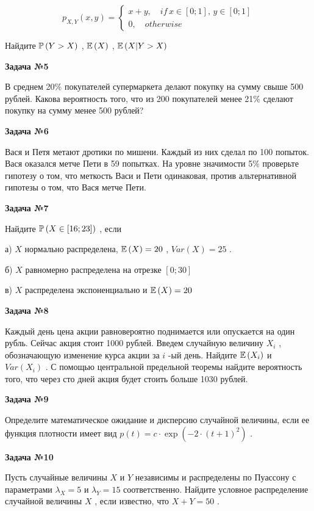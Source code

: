 \documentclass[pdftex,12pt,a4paper]{article}
\begin{document}
$$p_{X,Y} \left(x,y\right)=\left\{\begin{array}{l} {x+y,\quad if\, x\in \left[0;1\right],\, y\in \left[0;1\right]} \\ {0,\quad otherwise} \end{array}\right. $$

Найдите  $\P\left(Y>X\right)$ ,  $\E\left(X\right)$ ,  $\E\left(X|Y>X\right)$ 

{\bf Задача №5}

В среднем 20\% покупателей супермаркета делают покупку на сумму свыше 500 рублей. Какова вероятность того, что из 200 покупателей менее 21\% сделают покупку на сумму менее 500 рублей?

{\bf Задача №}{\bf 6}

Вася и Петя метают дротики по мишени. Каждый из них сделал по 100 попыток. Вася оказался метче Пети в 59 попытках. На уровне значимости 5\% проверьте гипотезу о том, что меткость Васи и Пети одинаковая, против альтернативной гипотезы о том, что Вася метче Пети.

{\bf Задача №7}

Найдите  $\P\left(X\in \left[16;23\right]\right)$ , если 

а)  $X$  нормально распределена,  $\E\left(X\right)=20$ ,  $Var\left(X\right)=25$ .

б)  $X$  равномерно распределена на отрезке  $\left[0;30\right]$ 

в)  $X$  распределена экспоненциально и  $\E\left(X\right)=20$ 

{\bf Задача №8}

Каждый день цена акции равновероятно поднимается или опускается на один рубль. Сейчас акция стоит 1000 рублей. Введем случайную величину  $X_{i} $ , обозначающую изменение курса акции за  $i$ -ый день. Найдите  $\E\left(X_{i} \right)$  и  $Var\left(X_{i} \right)$ . С помощью центральной предельной теоремы найдите вероятность того, что через сто дней акция будет стоить больше 1030 рублей.

{\bf Задача №9}

Определите математическое ожидание и дисперсию случайной величины, если ее функция плотности имеет вид  $p\left(t\right)=c\cdot \exp \left(-2\cdot \left(t+1\right)^{2} \right)$ .

{\bf Задача №10}

Пусть случайные величины  $X$  и  $Y$  независимы и распределены по Пуассону с параметрами  $\lambda _{X} =5$  и  $\lambda _{Y} =15$  соответственно. Найдите условное распределение случайной величины  $X$ , если известно, что  $X+Y=50$ .
\end{document}
